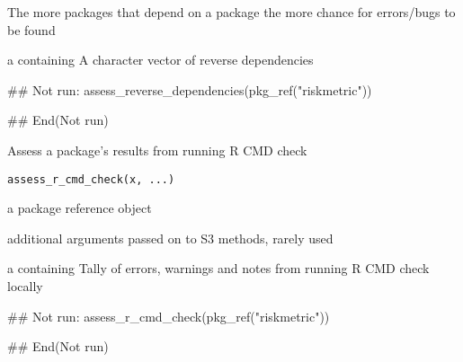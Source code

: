 \documentclass[a4paper]{book}
\begin{document}
%
\begin{Details}
The more packages that depend on a package the more chance
for errors/bugs to be found
\end{Details}
%
\begin{Value}
a  containing A character vector of reverse dependencies
\end{Value}
%
\begin{SeeAlso}
\end{SeeAlso}
%
\begin{Examples}
\begin{ExampleCode}
## Not run: 
assess_reverse_dependencies(pkg_ref("riskmetric"))

## End(Not run)
\end{ExampleCode}
\end{Examples}
%
\begin{Description}
Assess a package's results from running R CMD check
\end{Description}
%
\begin{Usage}
\begin{verbatim}
assess_r_cmd_check(x, ...)
\end{verbatim}
\end{Usage}
%
\begin{Arguments}
\begin{ldescription}
\item[\code{x}] a  package reference object

\item[\code{...}] additional arguments passed on to S3 methods, rarely used
\end{ldescription}
\end{Arguments}
%
\begin{Value}
a  containing Tally of errors, warnings and notes from running R CMD check locally
\end{Value}
%
\begin{SeeAlso}
\end{SeeAlso}
%
\begin{Examples}
\begin{ExampleCode}
## Not run: 
assess_r_cmd_check(pkg_ref("riskmetric"))

## End(Not run)
\end{ExampleCode}
\end{Examples}
\end{document}
